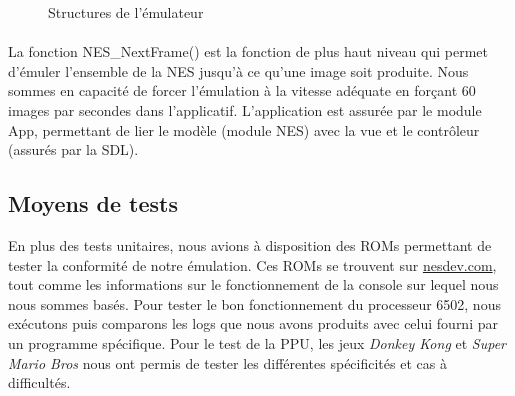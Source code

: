 \begin{figure}[H]
	\centering
  \hspace{2cm}
  \caption{Structures de l'émulateur}
  \label{fig:structure}
\end{figure}

\paragraph{}
La fonction NES\_NextFrame() est la fonction de plus haut niveau qui permet d'émuler l'ensemble de la NES jusqu’à ce qu'une image soit produite. Nous sommes en capacité de forcer l'émulation à la vitesse adéquate en forçant 60 images par secondes dans l'applicatif. L'application est assurée par le module App, permettant de lier le modèle (module NES) avec la vue et le contrôleur (assurés par la SDL).

\subsection{Moyens de tests}

En plus des tests unitaires, nous avions à disposition des ROMs permettant de tester la conformité de notre émulation. Ces ROMs se trouvent sur \url{nesdev.com}, tout comme les informations sur le fonctionnement de la console sur lequel nous nous sommes basés. Pour tester le bon fonctionnement du processeur 6502, nous exécutons puis comparons les logs que nous avons produits avec celui fourni par un programme spécifique. Pour le test de la PPU, les jeux \emph{Donkey Kong} et \emph{Super Mario Bros} nous ont permis de tester les différentes spécificités et cas à difficultés.
